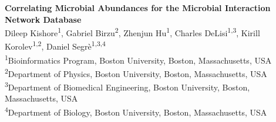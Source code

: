 
\begin{titlepage}

  \newcommand{\HRule}{\rule{\linewidth}{0.5mm}} %

  \center %





  \vspace{3.5 cm}
  { \huge \bfseries Correlating Microbial Abundances for the Microbial Interaction Network Database}\\[0.4cm] %


  \vspace{1.5 cm}
  Dileep Kishore\textsuperscript{1},
  Gabriel Birzu\textsuperscript{2},
  Zhenjun Hu\textsuperscript{1},
  Charles DeLisi\textsuperscript{1,3},
  Kirill Korolev\textsuperscript{1,2},
  Daniel Segr\`{e}\textsuperscript{1,3,4}\\
  \vspace{1cm}
  \textsuperscript{1}Bioinformatics Program, Boston University, Boston, Massachusetts, USA\\
  \textsuperscript{2}Department of Physics, Boston University, Boston, Massachusetts, USA\\
  \textsuperscript{3}Department of Biomedical Engineering, Boston University, Boston, Massachusetts, USA\\
  \textsuperscript{4}Department of Biology, Boston University, Boston, Massachusetts, USA\\




\vfill %

\end{titlepage}


\newpage
